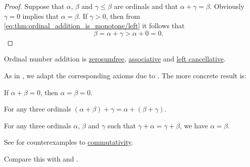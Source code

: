 \begin{proof}
  \NecessitySubProof Suppose that \( \alpha \), \( \beta \) and \( \gamma \leq \beta \) are ordinals and that \( \alpha + \gamma = \beta \). Obviously \( \gamma = 0 \) implies that \( \alpha = \beta \). If \( \gamma > 0 \), then from \eqref{eq:thm:ordinal_addition_is_monotone/left} it follows that
  \begin{equation*}
     \beta = \alpha + \gamma > \alpha + 0 = 0.
  \end{equation*}
\end{proof}

\begin{proposition}\label{thm:ordinal_addition_algebraic_properties}
  Ordinal number addition is \hyperref[def:zerosumfree]{zerosumfree}, \hyperref[def:binary_operation/associative]{associative} and \hyperref[def:binary_operation/cancellative]{left cancellative}.

  As in , we adapt the corresponding axioms due to . The more concrete result is:
  \begin{thmenum}
     If \( \alpha + \beta = 0 \), then \( \alpha = \beta = 0 \).

     For any three ordinals \( (\alpha + \beta) + \gamma = \alpha + (\beta + \gamma) \).

     For any three ordinals \( \alpha \), \( \beta \) and \( \gamma \) such that \( \gamma + \alpha = \gamma + \beta \), we have \( \alpha = \beta \).
  \end{thmenum}

   See  for counterexamples to \hyperref[def:binary_operation/commutative]{commutativity}.

   Compare this with  and .
\end{proposition}
